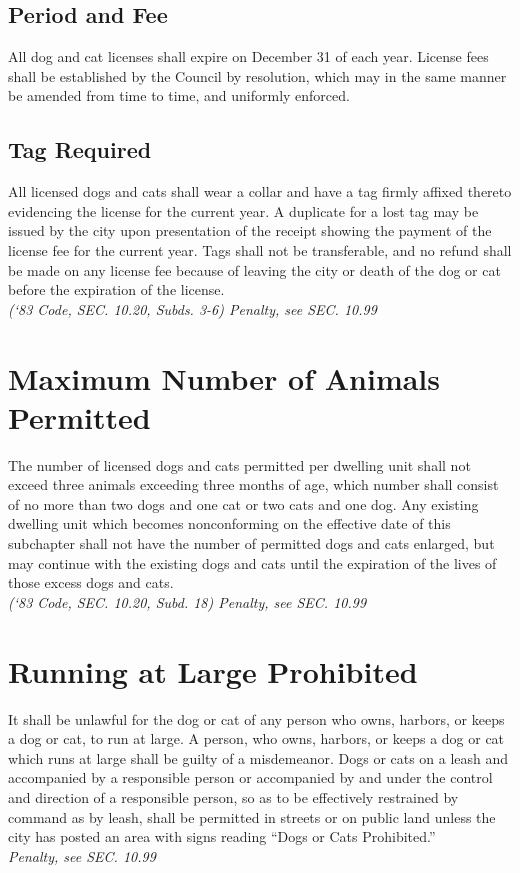 \documentclass[code.tex]{subfiles}
\begin{document}
\subsection{Period and Fee}
All dog and cat licenses shall expire on December 31 of each year.  License fees shall be established by the Council by resolution, which may in the same manner be amended from time to time, and uniformly enforced.
\subsection{Tag Required}
All licensed dogs and cats shall wear a collar and have a tag firmly affixed thereto evidencing the license for the current year.  A duplicate for a lost tag may be issued by the city upon presentation of the receipt showing the payment of the license fee for the current year.  Tags shall not be transferable, and no refund shall be made on any license fee because of leaving the city or death of the dog or cat before the expiration of the license.\\
\emph{(‘83 Code, SEC. 10.20, Subds. 3-6)  Penalty, see SEC. 10.99}

\section{Maximum Number of Animals Permitted}
The number of licensed dogs and cats permitted per dwelling unit shall not exceed three animals exceeding three months of age, which number shall consist of no more than two dogs and one cat or two cats and one dog. Any existing dwelling unit which becomes nonconforming on the effective date of this subchapter shall not have the number of permitted dogs and cats enlarged, but may continue with the existing dogs and cats until the expiration of the lives of those excess dogs and cats.\\
\emph{(‘83 Code, SEC. 10.20, Subd. 18)  Penalty, see SEC. 10.99}

\section{Running at Large Prohibited}
It shall be unlawful for the dog or cat of any person who owns, harbors, or keeps a dog or cat, to run at large.  A person, who owns, harbors, or keeps a dog or cat which runs at large shall be guilty of a misdemeanor.  Dogs or cats on a leash and accompanied by a responsible person or accompanied by and under the control and direction of a responsible person, so as to be effectively restrained by command as by leash, shall be permitted in streets or on public land unless the city has posted an area with signs reading “Dogs or Cats Prohibited.”\\
\emph{Penalty, see SEC. 10.99}
\end{document}
